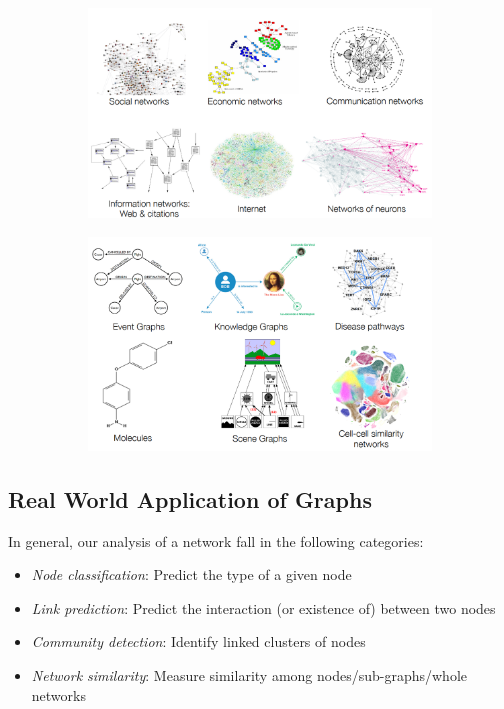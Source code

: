 \begin{figure}[ht]
  \centering
  \begin{subfigure}{0.45\textwidth}
    \includegraphics[width=\textwidth]{img/l1_p7_networks1.PNG}
    \label{fig:1}
  \end{subfigure}
  \begin{subfigure}{0.45\textwidth}
    \includegraphics[width=\textwidth]{img/l1_p10_networks2.PNG}
    \label{fig:2}
  \end{subfigure}
\end{figure}

\subsection{Real World Application of Graphs}

In general, our analysis of a network fall in the following categories:

\begin{itemize}
    \item \textit{Node classification}: Predict the type of a given node
    
    \item \textit{Link prediction}: Predict the interaction (or existence of) between two nodes
    
    \item \textit{Community detection}: Identify linked clusters of nodes
    
    \item \textit{Network similarity}: Measure similarity among nodes/sub-graphs/whole networks
\end{itemize}

